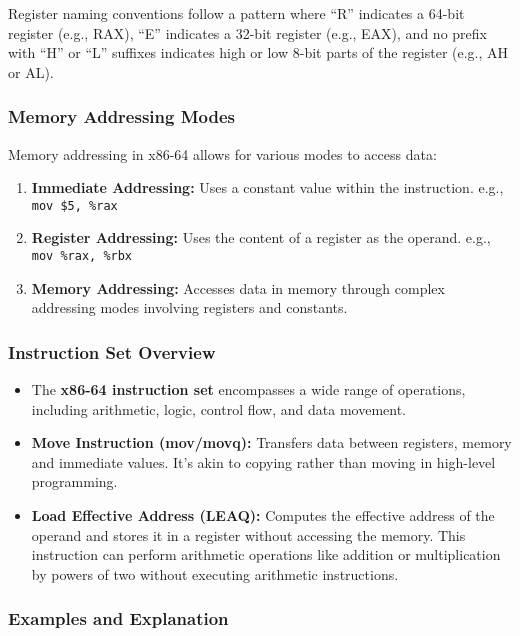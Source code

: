 \documentclass{article}
\begin{document}
Register naming conventions follow a pattern where ``R'' indicates a 64-bit register (e.g., RAX), ``E'' indicates a 32-bit register (e.g., EAX), and no prefix with ``H'' or ``L'' suffixes indicates high or low 8-bit parts of the register (e.g., AH or AL).

\subsubsection{Memory Addressing Modes}

Memory addressing in x86-64 allows for various modes to access data:

\begin{enumerate}
  \item \textbf{Immediate Addressing:} Uses a constant value within the instruction. e.g., \texttt{mov \$5, \%rax}
  \item \textbf{Register Addressing:} Uses the content of a register as the operand. e.g., \texttt{mov \%rax, \%rbx}
  \item \textbf{Memory Addressing:} Accesses data in memory through complex addressing modes involving registers and constants.
\end{enumerate}

\subsubsection{Instruction Set Overview}

\begin{itemize}
  \item The \textbf{x86-64 instruction set} encompasses a wide range of operations, including arithmetic, logic, control flow, and data movement.
  \item \textbf{Move Instruction (mov/movq):} Transfers data between registers, memory and immediate values. It’s akin to copying rather than moving in high-level programming.
  \item \textbf{Load Effective Address (LEAQ):} Computes the effective address of the operand and stores it in a register without accessing the memory. This instruction can perform arithmetic operations like addition or multiplication by powers of two without executing arithmetic instructions.
\end{itemize}

\subsubsection{Examples and Explanation}
\end{document}

